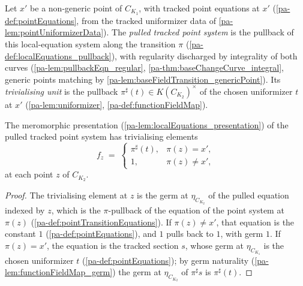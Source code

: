 \begin{definition}
  \label{pa-def:pointTransitionEquations}
  \leanok

  Let \(x'\) be a non-generic point of \(C_{K_1}\), with tracked point equations at
  \(x'\) (\ref{pa-def:pointEquations}, from the tracked uniformizer data of
  \ref{pa-lem:pointUniformizerData}). The \emph{pulled tracked point system} is the
  pullback of this local-equation system along the transition \(\pi\)
  (\ref{pa-def:localEquations_pullback}), with regularity discharged by integrality of
  both curves (\ref{pa-lem:pullbackEqn_regular}, \ref{pa-thm:baseChangeCurve_integral},
  generic points matching by \ref{pa-lem:baseFieldTransition_genericPoint}). Its
  \emph{trivialising unit} is the pullback
  \(\pi^{\sharp}(t) \in K(C_{K_2})^{\times}\) of the chosen uniformizer \(t\) at
  \(x'\) (\ref{pa-lem:uniformizer}, \ref{pa-def:functionFieldMap}).
\end{definition}

\begin{lemma}
  \label{pa-lem:pointTransitionEquations_elem}
  \leanok

  The meromorphic presentation (\ref{pa-lem:localEquations_presentation}) of the pulled
  tracked point system has trivialising elements
  \[
    f_z \;=\;
    \begin{cases}
      \pi^{\sharp}(t), & \pi(z) = x', \\
      1, & \pi(z) \neq x',
    \end{cases}
  \]
  at each point \(z\) of \(C_{K_2}\).
\end{lemma}
\begin{proof}
  \leanok
  The trivialising element at \(z\) is the germ at \(\eta_{C_{K_2}}\) of the pulled
  equation indexed by \(z\), which is the \(\pi\)-pullback of the equation of the
  point system at \(\pi(z)\) (\ref{pa-def:pointTransitionEquations}). If
  \(\pi(z) \neq x'\), that equation is the constant \(1\)
  (\ref{pa-def:pointEquations}), and \(1\) pulls back to \(1\), with germ \(1\). If
  \(\pi(z) = x'\), the equation is the tracked section \(s\), whose germ at
  \(\eta_{C_{K_1}}\) is the chosen uniformizer \(t\) (\ref{pa-def:pointEquations});
  by germ naturality (\ref{pa-lem:functionFieldMap_germ}) the germ at
  \(\eta_{C_{K_2}}\) of \(\pi^{\sharp}s\) is \(\pi^{\sharp}(t)\).
\end{proof}

